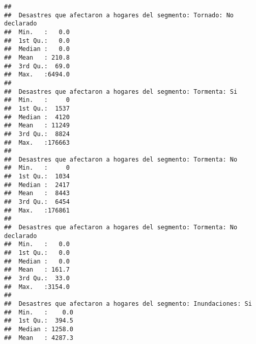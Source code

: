 \documentclass[11pt,]{article}
\begin{document}
\begin{verbatim}
##                                                             
##  Desastres que afectaron a hogares del segmento: Tornado: No declarado
##  Min.   :   0.0                                                       
##  1st Qu.:   0.0                                                       
##  Median :   0.0                                                       
##  Mean   : 210.8                                                       
##  3rd Qu.:  69.0                                                       
##  Max.   :6494.0                                                       
##                                                                       
##  Desastres que afectaron a hogares del segmento: Tormenta: Si
##  Min.   :     0                                              
##  1st Qu.:  1537                                              
##  Median :  4120                                              
##  Mean   : 11249                                              
##  3rd Qu.:  8824                                              
##  Max.   :176663                                              
##                                                              
##  Desastres que afectaron a hogares del segmento: Tormenta: No
##  Min.   :     0                                              
##  1st Qu.:  1034                                              
##  Median :  2417                                              
##  Mean   :  8443                                              
##  3rd Qu.:  6454                                              
##  Max.   :176861                                              
##                                                              
##  Desastres que afectaron a hogares del segmento: Tormenta: No declarado
##  Min.   :   0.0                                                        
##  1st Qu.:   0.0                                                        
##  Median :   0.0                                                        
##  Mean   : 161.7                                                        
##  3rd Qu.:  33.0                                                        
##  Max.   :3154.0                                                        
##                                                                        
##  Desastres que afectaron a hogares del segmento: Inundaciones: Si
##  Min.   :    0.0                                                 
##  1st Qu.:  394.5                                                 
##  Median : 1258.0                                                 
##  Mean   : 4287.3                                                 

\end{verbatim}
\end{document}
